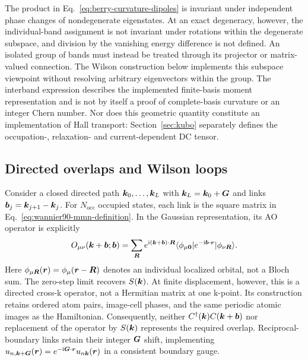 The product in Eq.~\eqref{eq:berry-curvature-dipoles} is invariant under
independent phase changes of nondegenerate eigenstates. At an exact
degeneracy, however, the individual-band assignment is not invariant
under rotations within the degenerate subspace, and division by the
vanishing energy difference is not defined. An isolated group of bands
must instead be treated through its projector or matrix-valued
connection. The Wilson construction below implements this subspace
viewpoint without resolving arbitrary eigenvectors within the group.
The interband expression describes the implemented finite-basis moment
representation and is not by itself a proof of complete-basis curvature
or an integer Chern number. Nor does this geometric quantity constitute
an implementation of Hall transport: Section~\ref{sec:kubo} separately
defines the occupation-, relaxation- and current-dependent DC tensor.

\subsection{Directed overlaps and Wilson loops}
Consider a closed directed path $\bm{k}_0,\ldots,\bm{k}_{L}$ with
$\bm{k}_L=\bm{k}_0+\bm{G}$ and links $\bm{b}_j=\bm{k}_{j+1}-\bm{k}_j$.
For $N_{\mathrm{occ}}$ occupied states, each link is the square matrix in
Eq.~\eqref{eq:wannier90-mmn-definition}. In the Gaussian representation,
its AO operator is explicitly
\begin{equation}
 O_{\mu\nu}(\bm{k}+\bm{b};\bm{b})=
 \sum_{\bm{R}}e^{\mathrm{i}(\bm{k}+\bm{b})\cdot\bm{R}}
 \langle\phi_{\mu\bm 0}|e^{-\mathrm{i}\bm{b}\cdot\bm{r}}|\phi_{\nu\bm{R}}\rangle .
 \label{eq:topology-ao-operator}
\end{equation}
Here $\phi_{\mu\bm{R}}(\bm{r})=\phi_\mu(\bm{r}-\bm{R})$ denotes an
individual localized orbital, not a Bloch sum. The zero-step limit
recovers $S(\bm{k})$. At finite displacement, however,
this is a directed cross-k operator, not a Hermitian matrix at one k-point.
Its construction retains ordered atom pairs, image-cell phases, and the
same periodic atomic images as the Hamiltonian. Consequently, neither
$C^\dagger(\bm{k})C(\bm{k}+\bm{b})$ nor replacement of the operator by $S(\bm{k})$
represents the required overlap. Reciprocal-boundary links retain their
integer $\bm{G}$ shift, implementing
$u_{n,\bm{k}+\bm{G}}(\bm{r})=e^{-\mathrm{i}\bm{G}\cdot\bm{r}}u_{n\bm{k}}(\bm{r})$ in a consistent
boundary gauge.

